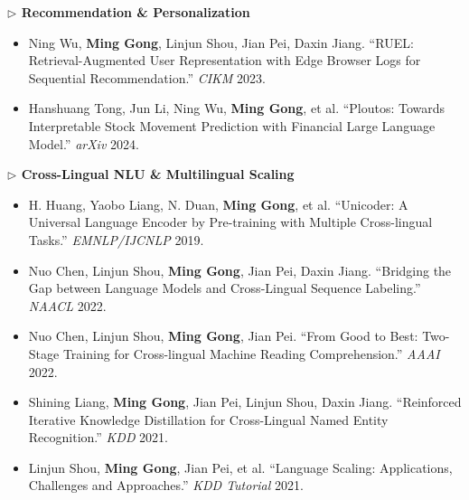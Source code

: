 \documentclass[10.5pt,letterpaper]{article}
\begin{document}
\noindent\textcolor{blue!60!black}{\textbf{$\triangleright$ Recommendation \& Personalization}}
\begin{itemize}
  \item Ning Wu, \textbf{Ming Gong}, Linjun Shou, Jian Pei, Daxin Jiang. ``RUEL: Retrieval-Augmented User Representation with Edge Browser Logs for Sequential Recommendation.'' \textit{CIKM} 2023.
  \item Hanshuang Tong, Jun Li, Ning Wu, \textbf{Ming Gong}, et al. ``Ploutos: Towards Interpretable Stock Movement Prediction with Financial Large Language Model.'' \textit{arXiv} 2024.
\end{itemize}

\noindent\textcolor{blue!60!black}{\textbf{$\triangleright$ Cross-Lingual NLU \& Multilingual Scaling}}
\begin{itemize}
  \item H. Huang, Yaobo Liang, N. Duan, \textbf{Ming Gong}, et al. ``Unicoder: A Universal Language Encoder by Pre-training with Multiple Cross-lingual Tasks.'' \textit{EMNLP/IJCNLP} 2019.
  \item Nuo Chen, Linjun Shou, \textbf{Ming Gong}, Jian Pei, Daxin Jiang. ``Bridging the Gap between Language Models and Cross-Lingual Sequence Labeling.'' \textit{NAACL} 2022.
  \item Nuo Chen, Linjun Shou, \textbf{Ming Gong}, Jian Pei. ``From Good to Best: Two-Stage Training for Cross-lingual Machine Reading Comprehension.'' \textit{AAAI} 2022.
  \item Shining Liang, \textbf{Ming Gong}, Jian Pei, Linjun Shou, Daxin Jiang. ``Reinforced Iterative Knowledge Distillation for Cross-Lingual Named Entity Recognition.'' \textit{KDD} 2021.
  \item Linjun Shou, \textbf{Ming Gong}, Jian Pei, et al. ``Language Scaling: Applications, Challenges and Approaches.'' \textit{KDD Tutorial} 2021.
\end{itemize}

\end{document}

